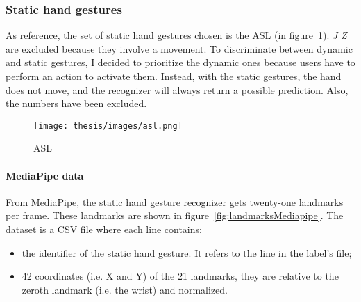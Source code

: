 \documentclass[../thesis.tex]{subfiles}
\begin{document}
\subsubsection{Static hand gestures}
As reference, the set of static hand gestures chosen is the \gls{ASL} (in figure~\ref{fig:asl}). \textit{J} \textit{Z} are excluded because they involve a movement. To discriminate between dynamic and static gestures, I decided to prioritize the dynamic ones because users have to perform an action to activate them. Instead, with the static gestures, the hand does not move, and the recognizer will always return a possible prediction. Also, the numbers have been excluded. 

\begin{figure}
    \centering
    \texttt{[image: thesis/images/asl.png]}
    \caption{\glsdesc{ASL}~\parencite{img:asl}}\label{fig:asl}
\end{figure}

\paragraph{MediaPipe data}
From MediaPipe, the static hand gesture recognizer gets twenty-one landmarks per frame. These landmarks are shown in figure~\ref{fig:landmarksMediapipe}. The dataset is a CSV file where each line contains:
\begin{itemize}
    \item the identifier of the static hand gesture. It refers to the line in the label’s file; 
    \item 42 coordinates (i.e. X and Y) of the 21 landmarks, they are relative to the zeroth landmark (i.e. the wrist) and normalized. 
\end{itemize}
\end{document}
